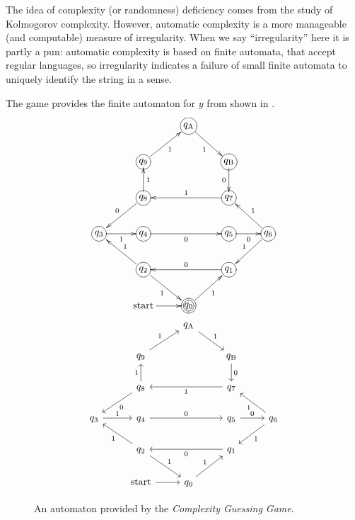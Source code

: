 	The idea of complexity (or randomness) deficiency comes from the study of Kolmogorov complexity.
	However, automatic complexity is a more manageable (and computable) measure of irregularity.
	When we say ``irregularity'' here it is partly a pun:
	automatic complexity is based on finite automata, that accept regular languages,
	so irregularity indicates a failure of small finite automata to uniquely identify the string in a sense.

	The game provides the finite automaton for $y$ from  shown in .
	\begin{figure}
		\centering
		\[
			\xymatrix{
									&								& *+[Fo]{q_{\mathrm A}}\ar[dr]_1   &			   &\\
									& *+[Fo]{q_9}\ar[ur]_1			&				   & *+[Fo]{q_{\mathrm B}}\ar[d]_0  \\
									& *+[Fo]{q_8}\ar[u]_1\ar[dl]_0	&				   & *+[Fo]{q_7}\ar[ll]_1			\\
				*+[Fo]{q_3}\ar[r]_1 & *+[Fo]{q_4}\ar[rr]_0			&				   & *+[Fo]{q_5}\ar[r]_0		   & *+[Fo]{q_6}\ar[ul]_1\ar[dl]_1\\
									& *+[Fo]{q_2}\ar[ul]_1\ar[dr]_1	&				   & *+[Fo]{q_1}\ar[ll]_0		   & \\
									&\text{start}\ar[r]				& *+[Foo]{q_0}\ar[ur]_1
			}
\]
\[
\begin{tikzcd}
    & & q_{\mathrm{A}} \arrow[dr, "1"] & & \\
    & q_9 \arrow[ur, "1"] & & q_{\mathrm{B}} \arrow[d, "0"] \\
    & q_8 \arrow[u, "1"] \arrow[dl, "0"] & & q_7 \arrow[ll, "1"] \\
    q_3 \arrow[r, "1"] & q_4 \arrow[rr, "0"] & & q_5 \arrow[r, "0"] & q_6 \arrow[ul, "1"] \arrow[dl, "1"] \\
    & q_2 \arrow[ul, "1"] \arrow[dr, "1"] & & q_1 \arrow[ll, "0"] & \\
    & \text{start} \arrow[r] & q_0 \arrow[ur, "1"]
\end{tikzcd}
		\]
		\caption{An automaton provided by the \emph{Complexity Guessing Game}.}\label{y-automaton}
	\end{figure}
